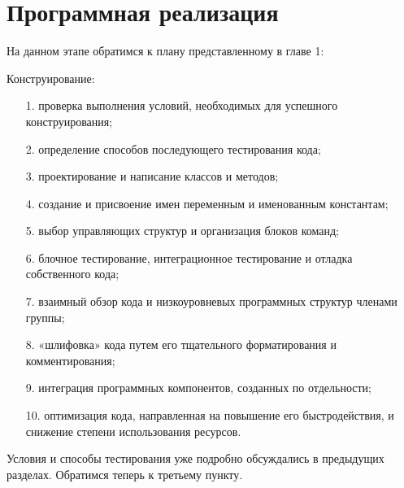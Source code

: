 \documentclass[a4paper,14pt,russian]{extreport}
\begin{document}
\section{Программная реализация}
На данном этапе обратимся к плану представленному в главе 1:
\par
Конструирование: 
\begin{enumerate}
\item[1.] проверка выполнения условий, необходимых для успешного конструирования;
\item[2.] определение способов последующего тестирования кода;
\item[3.] проектирование и написание классов и методов;
\item[4.] создание и присвоение имен переменным и именованным константам;
\item[5.] выбор управляющих структур и организация блоков команд;
\item[6.] блочное тестирование, интеграционное тестирование и отладка собственного кода;
\item[7.] взаимный обзор кода и низкоуровневых программных структур членами группы;
\item[8.] «шлифовка» кода путем его тщательного форматирования и комментирования;
\item[9.] интеграция программных компонентов, созданных по отдельности;
\item[10.] оптимизация кода, направленная на повышение его быстродействия, и снижение степени использования ресурсов.
\end{enumerate}
\par
Условия и способы тестирования уже подробно обсуждались в предыдущих разделах. Обратимся теперь к третьему пункту. 
\end{document}
